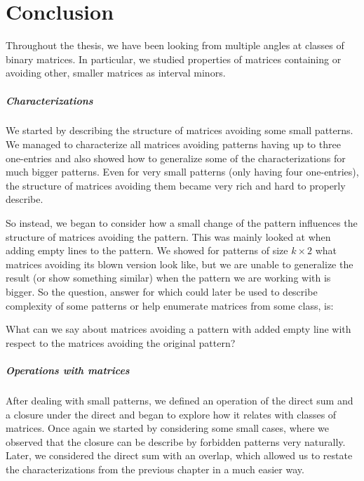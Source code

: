 \chapter*{Conclusion}
Throughout the thesis, we have been looking from multiple angles at classes of binary matrices. In particular, we studied properties of matrices containing or avoiding other, smaller matrices as interval minors.

\paragraph{Characterizations}
We started by describing the structure of matrices avoiding some small patterns. We managed to characterize all matrices avoiding patterns having up to three one-entries and also showed how to generalize some of the characterizations for much bigger patterns. Even for very small patterns (only having four one-entries), the structure of matrices avoiding them became very rich and hard to properly describe.

So instead, we began to consider how a small change of the pattern influences the structure of matrices avoiding the pattern. This was mainly looked at when adding empty lines to the pattern. We showed for patterns of size $k\times2$ what matrices avoiding its blown version look like, but we are unable to generalize the result (or show something similar) when the pattern we are working with is bigger. So the question, answer for which could later be used to describe complexity of some patterns or help enumerate matrices from some class, is:
\begin{ques}
What can we say about matrices avoiding a pattern with added empty line with respect to the matrices avoiding the original pattern?
\end{ques}

\paragraph{Operations with matrices}
After dealing with small patterns, we defined an operation of the direct sum and a closure under the direct and began to explore how it relates with classes of matrices. Once again we started by considering some small cases, where we observed that the closure can be describe by forbidden patterns very naturally. Later, we considered the direct sum with an overlap, which allowed us to restate the characterizations from the previous chapter in a much easier way.

